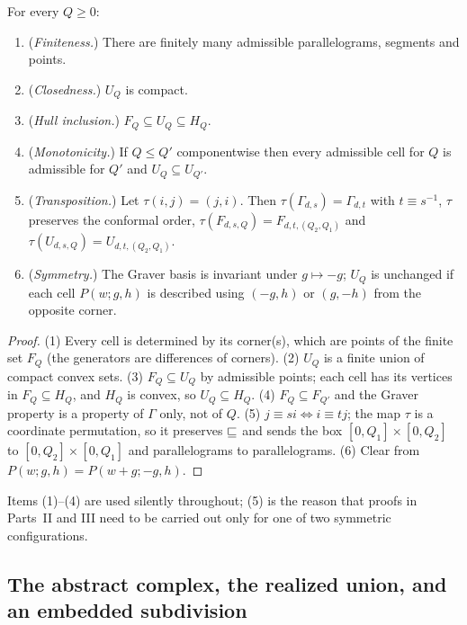 \begin{proposition}\label{prop:elem}
For every $Q\ge0$:
\begin{enumerate}
\item (\emph{Finiteness.}) There are finitely many admissible parallelograms, segments and points.
\item (\emph{Closedness.}) $U_Q$ is compact.
\item (\emph{Hull inclusion.}) $F_Q\subseteq U_Q\subseteq H_Q$.
\item (\emph{Monotonicity.}) If $Q\le Q'$ componentwise then every admissible cell for $Q$ is admissible for $Q'$ and $U_Q\subseteq U_{Q'}$.
\item (\emph{Transposition.}) Let $\tau(i,j)=(j,i)$. Then $\tau(\Gamma_{d,s})=\Gamma_{d,t}$ with $t\equiv s^{-1}$, $\tau$ preserves the conformal order, $\tau(F_{d,s,Q})=F_{d,t,(Q_2,Q_1)}$ and $\tau(U_{d,s,Q})=U_{d,t,(Q_2,Q_1)}$.
\item (\emph{Symmetry.}) The Graver basis is invariant under $g\mapsto-g$; $U_Q$ is unchanged if each cell $P(w;g,h)$ is described using $(-g,h)$ or $(g,-h)$ from the opposite corner.
\end{enumerate}
\end{proposition}
\begin{proof}
(1) Every cell is determined by its corner(s), which are points of the finite set $F_Q$ (the generators are differences of corners). (2) $U_Q$ is a finite union of compact convex sets. (3) $F_Q\subseteq U_Q$ by admissible points; each cell has its vertices in $F_Q\subseteq H_Q$, and $H_Q$ is convex, so $U_Q\subseteq H_Q$. (4) $F_Q\subseteq F_{Q'}$ and the Graver property is a property of $\Gamma$ only, not of $Q$. (5) $j\equiv si\iff i\equiv tj$; the map $\tau$ is a coordinate permutation, so it preserves $\sqsubseteq$ and sends the box $[0,Q_1]\times[0,Q_2]$ to $[0,Q_2]\times[0,Q_1]$ and parallelograms to parallelograms. (6) Clear from $P(w;g,h)=P(w+g;-g,h)$.
\end{proof}

\begin{remark}
Items (1)--(4) are used silently throughout; (5) is the reason that proofs in Parts~II and III need to be carried out only for one of two symmetric configurations.
\end{remark}

\subsection{The abstract complex, the realized union, and an embedded subdivision}\label{sec:kabs}

